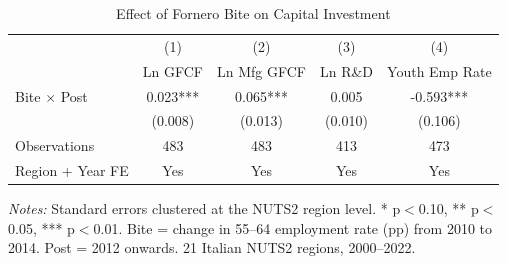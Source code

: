 \begin{table}[H]
\centering
\caption{Effect of Fornero Bite on Capital Investment}
\label{tab:main}
\small
\begin{threeparttable}
\begin{tabular}{lcccc}
\toprule
& (1) & (2) & (3) & (4) \\
& Ln GFCF & Ln Mfg GFCF & Ln R\&D & Youth Emp Rate \\
\midrule
Bite $\times$ Post & 0.023*** & 0.065*** & 0.005 & -0.593*** \\
& (0.008) & (0.013) & (0.010) & (0.106) \\
\midrule
Observations & 483 & 483 & 413 & 473 \\
Region + Year FE & Yes & Yes & Yes & Yes \\
\bottomrule
\end{tabular}
\begin{tablenotes}[flushleft]
\footnotesize
\item \textit{Notes:} Standard errors clustered at the NUTS2 region level. * p$<$0.10, ** p$<$0.05, *** p$<$0.01. Bite = change in 55--64 employment rate (pp) from 2010 to 2014. Post = 2012 onwards. 21 Italian NUTS2 regions, 2000--2022.
\end{tablenotes}
\end{threeparttable}
\end{table}

